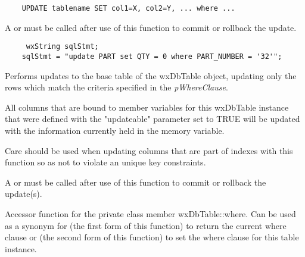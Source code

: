 \begin{verbatim}
    UPDATE tablename SET col1=X, col2=Y, ... where ...
\end{verbatim}




A  or 
 must be called after use of 
this function to commit or rollback the update.


\begin{verbatim}
	 wxString sqlStmt;
    sqlStmt = "update PART set QTY = 0 where PART_NUMBER = '32'";
\end{verbatim}


\label{wxdbtableupdatewhere}


Performs updates to the base table of the wxDbTable object, updating only the 
rows which match the criteria specified in the {\it pWhereClause}.

All columns that are bound to member variables for this wxDbTable instance 
that were defined with the "updateable" parameter set to TRUE will be updated 
with the information currently held in the memory variable.  




Care should be used when updating columns that are part of indexes with 
this function so as not to violate an unique key constraints.

A  or 
 must be called after use of 
this function to commit or rollback the update(s).


\label{wxdbtablewhere}



Accessor function for the private class member wxDbTable::where.  Can be used 
as a synonym for  
(the first form of this function) to return the current where clause or  
 (the second form 
of this function) to set the where clause for this table instance.

